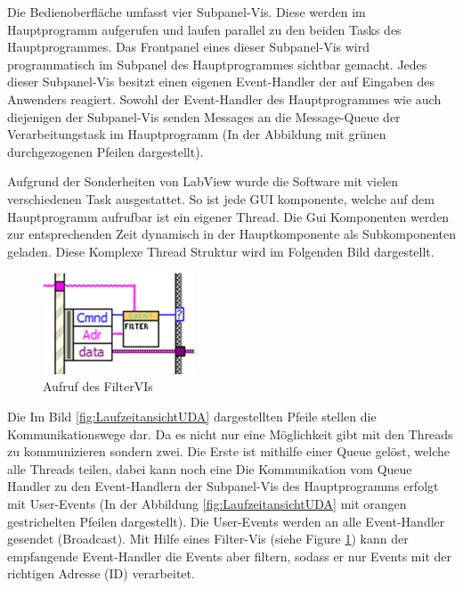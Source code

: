 \documentclass[10pt]{scrartcl}
\begin{document}
Die Bedienoberfläche umfasst vier Subpanel-Vis. Diese werden im Hauptprogramm aufgerufen und laufen parallel zu den beiden Tasks des Hauptprogrammes. Das Frontpanel eines dieser Subpanel-Vis wird programmatisch im Subpanel des Hauptprogrammes sichtbar gemacht.  
Jedes dieser Subpanel-Vis besitzt einen eigenen Event-Handler der auf Eingaben des Anwenders reagiert. Sowohl der Event-Handler des Hauptprogrammes wie auch diejenigen der Subpanel-Vis senden Messages an die Message-Queue der Verarbeitungstask im Hauptprogramm (In der Abbildung mit grünen durchgezogenen Pfeilen dargestellt).

Aufgrund der Sonderheiten von LabView wurde die Software mit vielen verschiedenen Task ausgestattet. So ist jede GUI komponente, welche auf dem Hauptprogramm aufrufbar ist ein eigener Thread. Die Gui Komponenten werden zur entsprechenden Zeit dynamisch in der Hauptkomponente als Subkomponenten geladen. Diese Komplexe Thread Struktur wird im Folgenden Bild dargestellt.


\begin{figure}
	\begin{center}
		\includegraphics[width=0.4\textwidth]{filterVI}
		\caption{Aufruf des FilterVIs}
		\label{fig:filterVI}
	\end{center}
\end{figure}
Die Im Bild \ref{fig:LaufzeitansichtUDA} dargestellten Pfeile stellen die Kommunikationswege dar. Da es nicht nur eine Möglichkeit gibt mit den Threads zu kommunizieren sondern zwei. Die Erste ist mithilfe einer Queue gelöst, welche alle Threads teilen, dabei kann noch eine
Die Kommunikation vom Queue Handler zu den Event-Handlern der Subpanel-Vis des Hauptprogramms erfolgt mit User-Events (In der Abbildung \ref{fig:LaufzeitansichtUDA} mit orangen gestrichelten Pfeilen dargestellt). Die User-Events werden an alle Event-Handler gesendet (Broadcast). Mit Hilfe eines Filter-Vis (siehe Figure \ref{fig:filterVI}) kann der empfangende Event-Handler die Events aber filtern, sodass er nur Events mit der richtigen Adresse (ID) verarbeitet.
\end{document}
